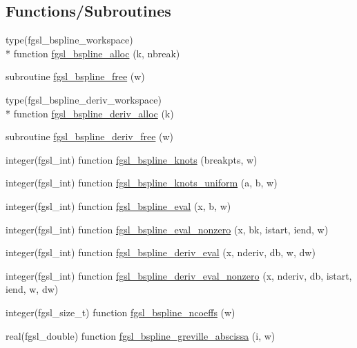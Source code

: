 \subsection*{Functions/\-Subroutines}
\begin{DoxyCompactItemize}
\item 
type(fgsl\-\_\-bspline\-\_\-workspace) \\*
function \hyperlink{bspline_8finc_a4e15c7b2231a5f1a625f5d182ca159ed}{fgsl\-\_\-bspline\-\_\-alloc} (k, nbreak)
\item 
subroutine \hyperlink{bspline_8finc_aa6355eaea88c1a3223784670cd61f944}{fgsl\-\_\-bspline\-\_\-free} (w)
\item 
type(fgsl\-\_\-bspline\-\_\-deriv\-\_\-workspace) \\*
function \hyperlink{bspline_8finc_afcbf1aea5432f70f6a80b96c503ce660}{fgsl\-\_\-bspline\-\_\-deriv\-\_\-alloc} (k)
\item 
subroutine \hyperlink{bspline_8finc_a8ccf44ef0167e5813a4671a5d5eaad8b}{fgsl\-\_\-bspline\-\_\-deriv\-\_\-free} (w)
\item 
integer(fgsl\-\_\-int) function \hyperlink{bspline_8finc_a0c926191aa070f99a3f01fd32fa1b95d}{fgsl\-\_\-bspline\-\_\-knots} (breakpts, w)
\item 
integer(fgsl\-\_\-int) function \hyperlink{bspline_8finc_ae8a83e75e87a6475b4ad8584c18c037d}{fgsl\-\_\-bspline\-\_\-knots\-\_\-uniform} (a, b, w)
\item 
integer(fgsl\-\_\-int) function \hyperlink{bspline_8finc_ad884eba33109f4963100c7a64601c9df}{fgsl\-\_\-bspline\-\_\-eval} (x, b, w)
\item 
integer(fgsl\-\_\-int) function \hyperlink{bspline_8finc_a2cf7b76c3b3eacc2458726ce7eec827a}{fgsl\-\_\-bspline\-\_\-eval\-\_\-nonzero} (x, bk, istart, iend, w)
\item 
integer(fgsl\-\_\-int) function \hyperlink{bspline_8finc_a1a0753fdf8d9e838bc1b1886b29e673c}{fgsl\-\_\-bspline\-\_\-deriv\-\_\-eval} (x, nderiv, db, w, dw)
\item 
integer(fgsl\-\_\-int) function \hyperlink{bspline_8finc_a42dce02a85085b1eddf167c995873e38}{fgsl\-\_\-bspline\-\_\-deriv\-\_\-eval\-\_\-nonzero} (x, nderiv, db, istart, iend, w, dw)
\item 
integer(fgsl\-\_\-size\-\_\-t) function \hyperlink{bspline_8finc_a88f74da4054f622ccec25854d7d82a26}{fgsl\-\_\-bspline\-\_\-ncoeffs} (w)
\item 
real(fgsl\-\_\-double) function \hyperlink{bspline_8finc_a3919f7952797fb2dd676ae3f910c6d9e}{fgsl\-\_\-bspline\-\_\-greville\-\_\-abscissa} (i, w)
\end{DoxyCompactItemize}



